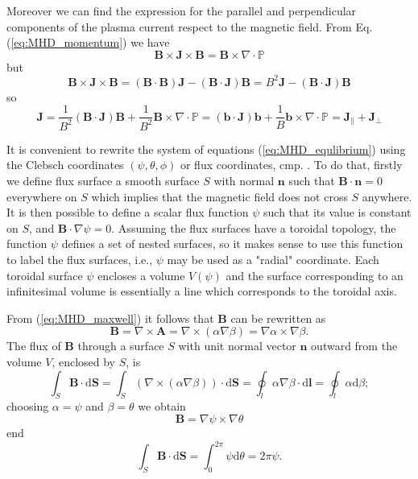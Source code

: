 Moreover we can find the expression for the parallel and perpendicular components of the plasma current respect to the magnetic field. From Eq.(\ref{eq:MHD_momentum}) we have
\begin{equation}
  \mathbf{B}\times\mathbf{J}\times\mathbf{B}=\mathbf{B}\times\nabla\cdot\mathbb{P}
\end{equation}
but
\begin{equation}
  \mathbf{B}\times\mathbf{J}\times\mathbf{B}=(\mathbf{B}\cdot\mathbf{B})\mathbf{J}-(\mathbf{B}\cdot\mathbf{J})\mathbf{B}=B^2\mathbf{J}-(\mathbf{B}\cdot\mathbf{J})\mathbf{B}
\end{equation}
so
\begin{equation}\label{eq:current_comp}
  \mathbf{J}=\frac{1}{B^2}(\mathbf{B}\cdot\mathbf{J})\mathbf{B}+\frac{1}{B^2}\mathbf{B}\times\nabla\cdot\mathbb{P}=
  (\mathbf{b}\cdot\mathbf{J})\mathbf{b}+\frac{1}{B}\mathbf{b}\times\nabla\cdot\mathbb{P}=\mathbf{J}_\parallel+\mathbf{J}_\perp
\end{equation}
\medskip

It is convenient to rewrite the system of equations (\ref{eq:MHD_equlibrium}) using the Clebsch coordinates $(\psi,\theta,\phi)$ or flux coordinates, cmp. \cite{fluxcoord}. To do that, firstly we define flux surface a smooth surface $S$ with normal $\textbf{n}$ such that $\mathbf{B}\cdot\mathbf{n}=0$ everywhere on $S$ which implies that the magnetic field does not cross $S$ anywhere.  It is then possible to define a scalar flux function $\psi$ such that its value is constant on $S$, and $\mathbf{B}\cdot\nabla \psi=0$. Assuming the flux surfaces have a toroidal topology, the function $\psi$ defines a set of nested surfaces, so it makes sense to use this function to label the flux surfaces, i.e., $\psi$ may be used as a "radial" coordinate. Each toroidal surface $\psi$ encloses a volume $V(\psi)$ and the surface corresponding to an infinitesimal volume is essentially a line which corresponds to the toroidal axis.

From (\ref{eq:MHD_maxwell}) it follows that $\mathbf{B}$ can be rewritten as
\begin{equation}
  \mathbf{B}=\nabla\times\mathbf{A}=\nabla\times(\alpha\nabla\beta)=\nabla\alpha\times\nabla\beta.
\end{equation}
The flux of $\mathbf{B}$ through a surface $S$ with unit normal vector $\mathbf{n}$ outward from the volume $V$, enclosed by $S$, is
\begin{equation}
  \int_S\mathbf{B}\cdot\mathrm{d}\mathbf{S}=\int_S(\nabla\times(\alpha\nabla\beta))\cdot\mathrm{d}\mathbf{S}=\oint_l\alpha\nabla\beta\cdot\mathrm{d}\mathbf{l}=\oint_l \alpha\mathrm{d}\beta;
\end{equation}
choosing $\alpha=\psi$ and $\beta=\theta$ we obtain
\begin{equation}\label{eq:clebsch}
  \mathbf{B}=\nabla\psi\times\nabla\theta
\end{equation}
end
\begin{equation}
 \int_S\mathbf{B}\cdot\mathrm{d}\mathbf{S}=\int_0^{2\pi} \psi\mathrm{d}\theta=2\pi\psi.
\end{equation}

